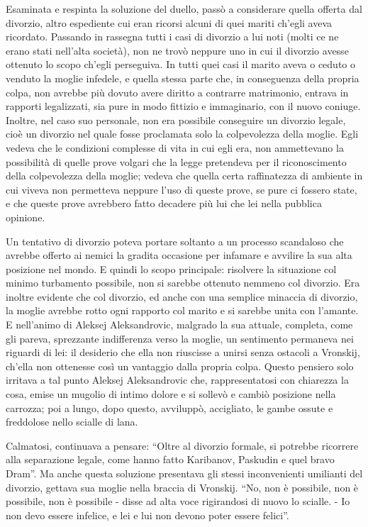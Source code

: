 Esaminata e respinta la soluzione del duello, passò a considerare quella offerta dal divorzio, altro espediente cui eran ricorsi alcuni di quei mariti ch'egli aveva ricordato. Passando in rassegna tutti i casi di divorzio a lui noti (molti ce ne erano stati nell'alta società), non ne trovò neppure uno in cui il divorzio avesse ottenuto lo scopo ch'egli perseguiva. In tutti quei casi il marito aveva o ceduto o venduto la moglie infedele, e quella stessa parte che, in conseguenza della propria colpa, non avrebbe più dovuto avere diritto a contrarre matrimonio, entrava in rapporti legalizzati, sia pure in modo fittizio e immaginario, con il nuovo coniuge. Inoltre, nel caso suo personale, non era possibile conseguire un divorzio legale, cioè un divorzio nel quale fosse proclamata solo la colpevolezza della moglie. Egli vedeva che le condizioni complesse di vita in cui egli era, non ammettevano la possibilità di quelle prove volgari che la legge pretendeva per il riconoscimento della colpevolezza della moglie; vedeva che quella certa raffinatezza di ambiente in cui viveva non permetteva neppure l'uso di queste prove, se pure ci fossero state, e che queste prove avrebbero fatto decadere più lui che lei nella pubblica opinione. 

Un tentativo di divorzio poteva portare soltanto a un processo scandaloso che avrebbe offerto ai nemici la gradita occasione per infamare e avvilire la sua alta posizione nel mondo. E quindi lo scopo principale: risolvere la situazione col minimo turbamento possibile, non si sarebbe ottenuto nemmeno col divorzio. Era inoltre evidente che col divorzio, ed anche con una semplice minaccia di divorzio, la moglie avrebbe rotto ogni rapporto col marito e si sarebbe unita con l'amante. E nell'animo di Aleksej Aleksandrovic, malgrado la sua attuale, completa, come gli pareva, sprezzante indifferenza verso la moglie, un sentimento permaneva nei riguardi di lei: il desiderio che ella non riuscisse a unirsi senza ostacoli a Vronskij, ch'ella non ottenesse così un vantaggio dalla propria colpa. Questo pensiero solo irritava a tal punto Aleksej Aleksandrovic che, rappresentatosi con chiarezza la cosa, emise un mugolio di intimo dolore e si sollevò e cambiò posizione nella carrozza; poi a lungo, dopo questo, avviluppò, accigliato, le gambe ossute e freddolose nello scialle di lana. 

Calmatosi, continuava a pensare: ``Oltre al divorzio formale, si potrebbe ricorrere alla separazione legale, come hanno fatto Karibanov, Paskudin e quel bravo Dram''. Ma anche questa soluzione presentava gli stessi inconvenienti umilianti del divorzio, gettava sua moglie nella braccia di Vronskij. ``No, non è possibile, non è possibile, non è possibile - disse ad alta voce rigirandosi di nuovo lo scialle. - Io non devo essere infelice, e lei e lui non devono poter essere felici''. 

